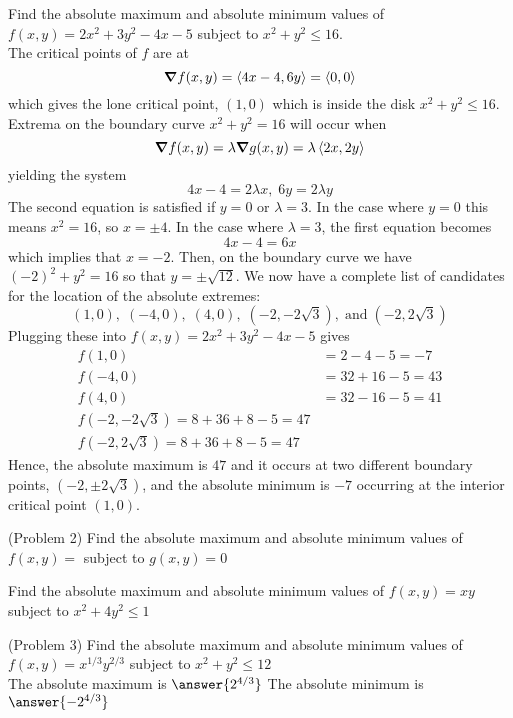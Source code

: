 \documentclass[handout]{ximera}
\begin{document}
\begin{example}[Example 2]
Find the absolute maximum and absolute minimum values of $f(x,y) = 2x^2 + 3y^2 - 4x - 5$ subject to $x^2 + y^2 \leq 16$.\\
The critical points of $f$ are at
\[
\boldsymbol\nabla f(x,y) = \left\langle 4x -4, 6y\right\rangle = \left\langle 0,0\right\rangle
\]
 which gives the lone critical point, $(1,0)$ which is inside the disk $x^2 + y^2 \leq 16$.\\
 Extrema on the boundary curve $x^2 + y^2 = 16$ will occur when
 \[
 \boldsymbol\nabla f(x,y) = \lambda \boldsymbol\nabla g(x,y) = \lambda \left\langle 2x, 2y\right\rangle
 \]
 yielding the system
 \[
 4x - 4 = 2\lambda x, \; 6y = 2\lambda y
 \]
 The second equation is satisfied if $y = 0$ or $\lambda = 3$.  In the case where $y = 0$ this means $x^2 = 16$, so $x = \pm 4$.
 In the case where $\lambda = 3$, the first equation becomes
 \[
 4x - 4 = 6x 
 \]
 which implies that $x = -2$.  Then, on the boundary curve we have $(-2)^2 + y^2 = 16$ so that $y = \pm \sqrt{12}$.
 We now have a complete list of candidates for the location of the absolute extremes:
 \[
 (1,0), \; (-4, 0), \; (4,0), \; (-2, -2\sqrt3), \;\text{and} \; (-2, 2\sqrt 3)
 \]
 Plugging these into $f(x,y) = 2x^2 + 3y^2 - 4x - 5$ gives
 \begin{align*}
 f(1,0) &= 2-4-5=-7\\
 f(-4, 0) &= 32 +16 -5 = 43\\
 f(4, 0) &= 32 -16 -5 = 41\\
 f(-2, -2\sqrt3) = 8 + 36 +8-5 = 47\\
 f(-2, 2\sqrt3) = 8 + 36 +8-5 = 47
 \end{align*}
 Hence, the absolute maximum is $47$ and it occurs at two different boundary points, $(-2, \pm 2\sqrt 3)$,
 and the absolute minimum is $-7$ occurring at the interior critical point $(1,0)$.
 
 
\end{example}

\begin{problem}(Problem 2)
Find the absolute maximum and absolute minimum values of $f(x,y) = $ subject to $g(x,y) = 0$\\
\end{problem}

\begin{example}[Example 3]
Find the absolute maximum and absolute minimum values of $f(x,y) = xy$ subject to $x^2 + 4y^2 \leq 1$\\
\end{example}

\begin{problem}(Problem 3)
Find the absolute maximum and absolute minimum values of $f(x,y) = x^{1/3}y^{2/3}$ subject to $x^2 + y^2 \leq 12$\\
The absolute maximum is $\answer{2^{4/3}}$
The absolute minimum is $\answer{-2^{4/3}}$
\end{problem}
\end{document}
